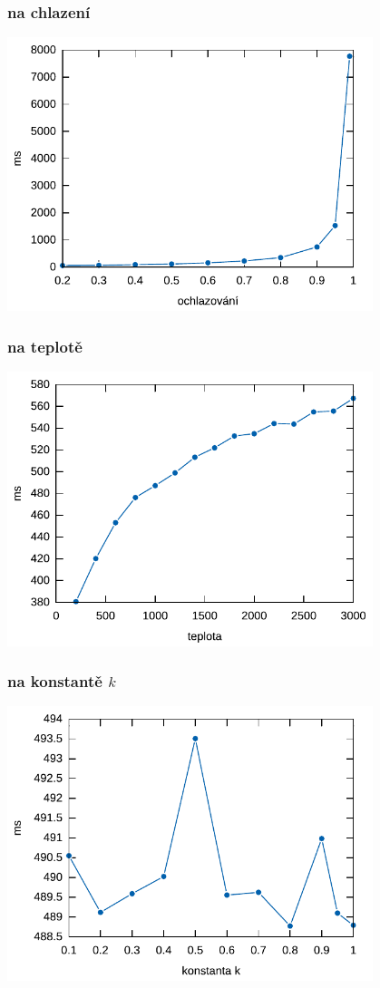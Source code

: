 \documentclass[a4paper,10pt]{article}
\begin{document}
\subsubsection*{na chlazení}
\begin{center}
\includegraphics[width=0.8\textwidth]{ochlazovani_time.pdf}
\end{center}
\subsubsection*{na teplotě}
\begin{center}
\includegraphics[width=0.8\textwidth]{teplota_time.pdf}
\end{center}
\subsubsection*{na konstantě $k$}
\begin{center}
\includegraphics[width=0.8\textwidth]{k_time.pdf}
\end{center}
\end{document}
